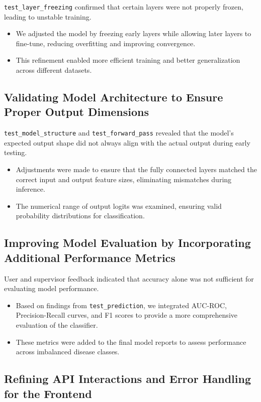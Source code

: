 \documentclass[12pt, titlepage]{article}
\begin{document}
\texttt{test\_layer\_freezing} confirmed that certain layers were not properly frozen, leading to unstable training.
\begin{itemize}
    \item We adjusted the model by freezing early layers while allowing later layers to fine-tune, reducing overfitting and improving convergence.
    \item This refinement enabled more efficient training and better generalization across different datasets.
\end{itemize}

\subsection{Validating Model Architecture to Ensure Proper Output Dimensions}

\texttt{test\_model\_structure} and \texttt{test\_forward\_pass} revealed that the model's expected output shape did not always align with the actual output during early testing.
\begin{itemize}
    \item Adjustments were made to ensure that the fully connected layers matched the correct input and output feature sizes, eliminating mismatches during inference.
    \item The numerical range of output logits was examined, ensuring valid probability distributions for classification.
\end{itemize}

\subsection{Improving Model Evaluation by Incorporating Additional Performance Metrics}

User and supervisor feedback indicated that accuracy alone was not sufficient for evaluating model performance.
\begin{itemize}
    \item Based on findings from \texttt{test\_prediction}, we integrated AUC-ROC, Precision-Recall curves, and F1 scores to provide a more comprehensive evaluation of the classifier.
    \item These metrics were added to the final model reports to assess performance across imbalanced disease classes.
\end{itemize}

\subsection{Refining API Interactions and Error Handling for the Frontend}
\end{document}
